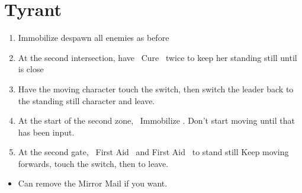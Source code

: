 \chapter{Tyrant}
\begin{enumerate}
\penelof Dispell and Immobilize on \penelo
\item Immobilize despawn all enemies as before
\item At the second intersection, have \ashe\ Cure \vaan\ twice to keep her standing still until  is close
\item Have the moving character touch the switch, then switch the leader back to the standing still character and leave.
\item At the start of the second zone, \penelo\ Immobilize \penelo. Don't start moving until that has been input.
\item At the second gate, \balthier\ First Aid \balthier\ and First Aid \ashe\ to stand still
\ashef Keep moving forwards, touch the switch, then \leader{\ashe} to leave.
\end{enumerate}
\begin{menu}
\party{\vaan, \ashe, \penelo}
\begin{itemize}
\item Can remove the Mirror Mail if you want.
\end{itemize}
\end{menu}
\begin{liscense}
\begin{itemize}
\end{itemize}
\end{liscense}
